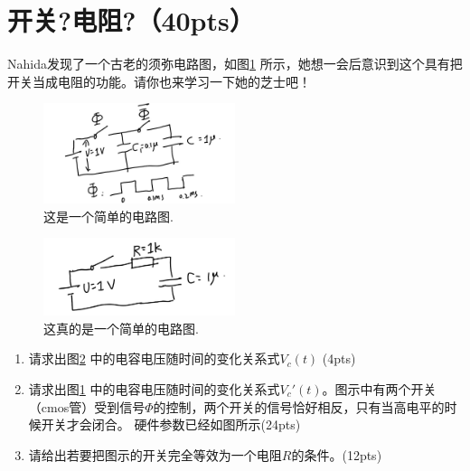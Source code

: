 \section{开关?电阻?（40pts）}
Nahida发现了一个古老的须弥电路图，如图\ref{switch} 所示，她想一会后意识到这个具有把开关当成电阻的功能。请你也来学习一下她的芝士吧！
\begin{figure}[htbp]
	\centering
	\includegraphics[width=0.5\textwidth]{switch}
	\caption{这是一个简单的电路图.}
	\label{switch}
\end{figure}
\begin{figure}[htbp]
	\centering
	\includegraphics[width=0.5\textwidth]{RC}
	\caption{这真的是一个简单的电路图.}
	\label{RC}
\end{figure}
\begin{enumerate}
	\item 请求出图\ref{RC} 中的电容电压随时间的变化关系式\(V_c(t)\) (4pts)
	\item 请求出图\ref{switch} 中的电容电压随时间的变化关系式\(V_c'(t)\)。图示中有两个开关（cmos管）受到信号\(\Phi\)的控制，两个开关的信号恰好相反，只有当高电平的时候开关才会闭合。 硬件参数已经如图所示(24pts)
	\item 请给出若要把图示的开关完全等效为一个电阻\(R\)的条件。(12pts)
\end{enumerate}